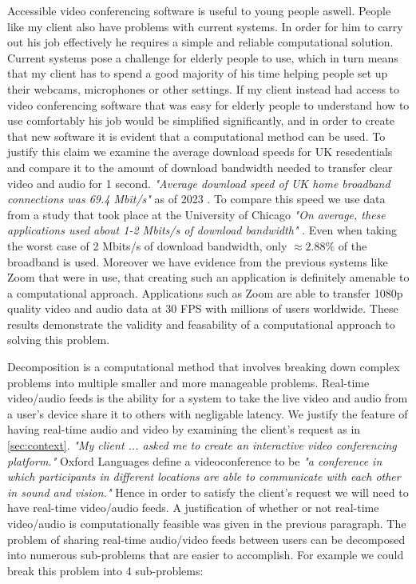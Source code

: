 Accessible video conferencing software is useful to young 
people aswell. People like my client also have problems with 
current systems. In order for him to carry out his job 
effectively he requires a simple and reliable computational
solution. Current systems pose a challenge for elderly people 
to use, which in turn means that my client has to spend a good
majority of his time helping people set up their webcams,
microphones or other settings. If my client instead had access
to video conferencing software that was easy for elderly people
to understand how to use comfortably his job would be 
simplified significantly, and in order to create that new 
software it is evident that a computational method can be 
used. To justify this claim we examine the average download
speeds for UK resedentials and compare it to the amount of 
download bandwidth needed to transfer clear video and audio 
for 1 second. \textit{"Average download speed of UK home 
broadband connections was 69.4 Mbit/s"} as of 2023 \cite{data}.
To compare this speed we use data from a study that took place
at the University of Chicago \textit{"On average, these
applications used about 1-2 Mbits/s of download bandwidth"}
\cite{chicago}. Even when taking the worst case of 2 Mbits/s
of download bandwidth, only $\approx 2.88\%$ of the broadband
is used. Moreover we have evidence from the previous systems 
like Zoom that were in use, that creating such an application
is definitely amenable to a computational approach.
Applications such as Zoom are able to transfer 1080p quality
video and audio data at 30 FPS with millions of users 
worldwide. These results demonstrate the validity and
feasability of a computational approach to solving this
problem. \\ \vspace{0.2cm}

Decomposition is a computational method that involves breaking
down complex problems into multiple smaller and more 
manageable problems. Real-time video/audio feeds is the ability
for a system to take the live video and audio from a user's 
device share it to others with negligable latency. We justify
the feature of having real-time audio and video by examining 
the client's request as in \ref{sec:context}. \textit{"My 
client ... asked me to create an interactive video conferencing
platform."} Oxford Languages define a videoconference to be 
\textit{"a conference in which participants in different 
locations are able to communicate with each other in sound and
vision."} Hence in order to satisfy the client's request we 
will need to have real-time video/audio feeds. A justification
of whether or not real-time video/audio is computationally 
feasible was given in the previous paragraph.
The problem of sharing real-time audio/video feeds between
users can be decomposed into numerous sub-problems that are
easier to accomplish. For example we could break this problem
into 4 sub-problems:

